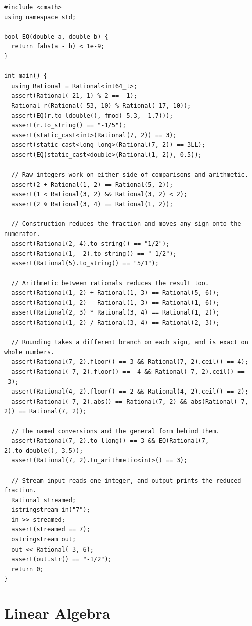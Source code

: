 \begin{lstlisting}[style=cpp]
#include <cmath>
using namespace std;

bool EQ(double a, double b) {
  return fabs(a - b) < 1e-9;
}

int main() {
  using Rational = Rational<int64_t>;
  assert(Rational(-21, 1) % 2 == -1);
  Rational r(Rational(-53, 10) % Rational(-17, 10));
  assert(EQ(r.to_ldouble(), fmod(-5.3, -1.7)));
  assert(r.to_string() == "-1/5");
  assert(static_cast<int>(Rational(7, 2)) == 3);
  assert(static_cast<long long>(Rational(7, 2)) == 3LL);
  assert(EQ(static_cast<double>(Rational(1, 2)), 0.5));

  // Raw integers work on either side of comparisons and arithmetic.
  assert(2 + Rational(1, 2) == Rational(5, 2));
  assert(1 < Rational(3, 2) && Rational(3, 2) < 2);
  assert(2 % Rational(3, 4) == Rational(1, 2));

  // Construction reduces the fraction and moves any sign onto the numerator.
  assert(Rational(2, 4).to_string() == "1/2");
  assert(Rational(1, -2).to_string() == "-1/2");
  assert(Rational(5).to_string() == "5/1");

  // Arithmetic between rationals reduces the result too.
  assert(Rational(1, 2) + Rational(1, 3) == Rational(5, 6));
  assert(Rational(1, 2) - Rational(1, 3) == Rational(1, 6));
  assert(Rational(2, 3) * Rational(3, 4) == Rational(1, 2));
  assert(Rational(1, 2) / Rational(3, 4) == Rational(2, 3));

  // Rounding takes a different branch on each sign, and is exact on whole numbers.
  assert(Rational(7, 2).floor() == 3 && Rational(7, 2).ceil() == 4);
  assert(Rational(-7, 2).floor() == -4 && Rational(-7, 2).ceil() == -3);
  assert(Rational(4, 2).floor() == 2 && Rational(4, 2).ceil() == 2);
  assert(Rational(-7, 2).abs() == Rational(7, 2) && abs(Rational(-7, 2)) == Rational(7, 2));

  // The named conversions and the general form behind them.
  assert(Rational(7, 2).to_llong() == 3 && EQ(Rational(7, 2).to_double(), 3.5));
  assert(Rational(7, 2).to_arithmetic<int>() == 3);

  // Stream input reads one integer, and output prints the reduced fraction.
  Rational streamed;
  istringstream in("7");
  in >> streamed;
  assert(streamed == 7);
  ostringstream out;
  out << Rational(-3, 6);
  assert(out.str() == "-1/2");
  return 0;
}
\end{lstlisting}

\section{\texorpdfstring{Linear Algebra}{6.5 Linear Algebra}}
\setcounter{section}{5}
\setcounter{subsection}{0}
